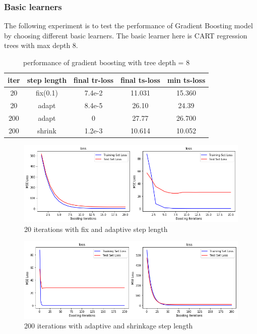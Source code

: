 \documentclass[10pt,twocolumn,letterpaper]{article}
\begin{document}
\subsubsection{Basic learners}
The following experiment is to test the performance of Gradient Boosting model by choosing different basic learners. The basic learner here is CART regression trees with max depth 8.

\begin{table}[ht]
\centering
\caption{performance of gradient boosting with tree depth = 8}
 \begin{tabular}{||c c c c c||} 
 \hline
iter & step length & final tr-loss & final ts-loss & min ts-loss \\ 
 \hline\hline
20   & fix(0.1) & 7.4e-2 & 11.031 & 15.360  \\ 
 \hline\hline
20   & adapt & 8.4e-5 & 26.10 & 24.39 \\ 
\hline\hline
200  & adapt & 0 & 27.77 & 26.700 \\ 
\hline\hline
200  & shrink & 1.2e-3 & 10.614 & 10.052\\ 
 \hline\hline
\end{tabular}
\label{table:d8gbloss}
\end{table}
\begin{figure}[h!]
  \includegraphics[width=\linewidth]{a.png}
  \caption{20 iterations with fix and adaptive step length}
  \label{fig:gb3}
\end{figure}
\begin{figure}[h!]
  \includegraphics[width=\linewidth]{c.png}
  \caption{200 iterations with adaptive and shrinkage step length}
  \label{fig:gb4}
\end{figure}
\end{document}
